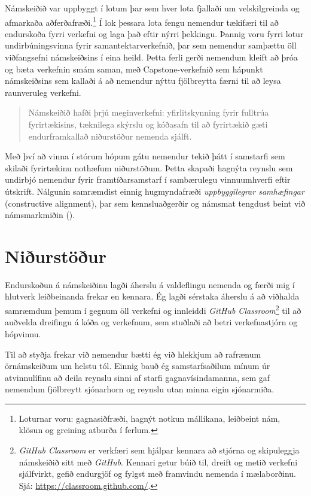 \documentclass{kennsluakademia_conf}
\begin{document}
Námskeiðið var uppbyggt í lotum þar sem hver lota fjallaði um velskilgreinda og afmarkaða aðferðafræði.\footnote{Loturnar voru: gagnasiðfræði, hagnýt notkun mállíkana, leiðbeint nám, klösun og greining atburða í ferlum.} Í lok þessara lota fengu nemendur tækifæri til að endurskoða fyrri verkefni og laga það eftir nýrri þekkingu. Þannig voru fyrri lotur undirbúningsvinna fyrir samantektarverkefnið, þar sem nemendur samþættu öll viðfangsefni námskeiðsins í eina heild. Þetta ferli gerði nemendum kleift að þróa og bæta verkefnin smám saman, með Capstone-verkefnið sem hápunkt námskeiðsins sem kallaði á að nemendur nýttu fjölbreytta færni til að leysa raunveruleg verkefni. 

\begin{quote}
Námskeiðið hafði þrjú meginverkefni: yfirlitskynning fyrir fulltrúa fyrirtækisins, tæknilega skýrslu og kóðasafn til að fyrirtækið gæti endurframkallað niðurstöður nemenda sjálft.
\end{quote}

Með því að vinna í stórum hópum gátu nemendur tekið þátt í samstarfi sem skilaði fyrirtækinu nothæfum niðurstöðum. Þetta skapaði hagnýta reynslu sem undirbjó nemendur fyrir framtíðar\-samstarf í sambærulegu vinnuumhverfi eftir útskrift. Nálgunin samræmdist einnig hugmyndafræði \textit{uppbyggilegrar samhæfingar} (constructive alignment), þar sem kennsluaðgerðir og námsmat tengdust beint við námsmarkmiðin (\cite{biggs_constructive}).


\section{Niðurstöður}

Endurskoðun á námskeiðinu lagði áherslu á valdeflingu nemenda og færði mig í hlutverk leiðbeinanda frekar en kennara. Ég lagði sérstaka áherslu á að viðhalda samræmdum þemum í gegnum öll verkefni og innleiddi \textit{GitHub Classroom}\footnote{\textit{GitHub Classroom} er verkfæri sem hjálpar kennara að stjórna og skipuleggja námskeiðið sitt með \textit{GitHub}. Kennari getur búið til, dreift og metið verkefni sjálfvirkt, gefið endurgjöf og fylgst með framvindu nemenda í mælaborðinu. Sjá: \url{https://classroom.github.com/}.} til að auðvelda dreifingu á kóða og verkefnum, sem stuðlaði að betri verkefnastjórn og hópvinnu.

Til að styðja frekar við nemendur bætti ég við hlekkjum að rafrænum örnámskeiðum um helstu tól. Einnig bauð ég samstarfsaðilum mínum úr atvinnulífinu að deila reynslu sinni af starfi gagnavísindamanna, sem gaf nemendum fjölbreytt sjónarhorn og reynslu utan minna eigin sjónarmiða.
\end{document}
